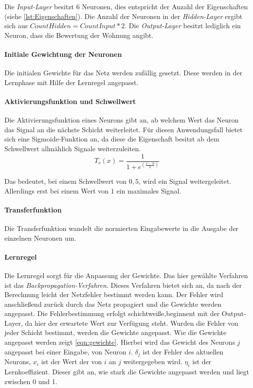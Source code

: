 Die \textit{Input-Layer} besitzt $6$ Neuronen, dies entspricht der
Anzahl der Eigenschaften (siehe \autoref{lst:Eigenschaften}).
Die Anzahl der Neuronen in der \textit{Hidden-Layer} ergibt sich aus
$CountHidden = CountInput * 2$. Die \textit{Output-Layer} besitzt
lediglich ein Neuron, dass die Bewertung der Wohnung angibt.

\paragraph{Initiale Gewichtung der Neuronen}
Die initialen Gewichte für das Netz werden zufällig gesetzt. Diese werden in der Lernphase
mit Hilfe der Lernregel angepasst.

\paragraph{Aktivierungsfunktion und Schwellwert}
Die Aktivierungsfunktion eines Neurons gibt an, ab welchem Wert das Neuron das
Signal an die nächste Schicht weiterleitet.
Für diesen Anwendungsfall bietet sich eine Sigmoide-Funktion an,
da diese die Eigenschaft besitzt ab dem Schwellwert allmählich
Signale weiterzuleiten.\\

\begin{equation}
    T_s(x) = \frac{1}{1+e^(\frac{x-S}{k})}
\end{equation}

Das bedeutet, bei einem Schwellwert von $0,5$, wird ein Signal weitergeleitet.
Allerdings erst bei einem Wert von $1$ ein maximales Signal.


\paragraph{Transferfunktion}
Die Transferfunktion wandelt die normierten Eingabewerte in die Ausgabe der einzelnen Neuronen um.

\paragraph{Lernregel}
Die Lernregel sorgt für die Anpassung der Gewichte. Das hier gewählte
Verfahren ist das \textit{Backpropagation-Verfahren}.
Dieses Verfahren bietet sich an, da nach der Berechnung leicht der Netzfehler bestimmt werden kann.
Der Fehler wird anschließend zurück durch das Netz propagiert und die Gewichte
werden angepasst. Die Fehlerbestimmung erfolgt schichtweiße,beginnent mit der Output-Layer,
da hier der erwartete Wert zur Verfügung steht. Wurden die Fehler von jeder
Schicht bestimmt, werden die Gewichte angepasst.
Wie die Gewichte angepasst werden zeigt \autoref{eqn:gewichte}.
Hierbei wird das Gewicht des Neurons $j$ angepasst bei einer Eingabe,
von Neuron $i$.
$\delta_j$ ist der Fehler des aktuellen Neurons, $x_i$ ist der Wert der von $i$ an $j$ weitergegeben wird.
$\eta_i$ ist der Lernkoeffizient.
Dieser gibt an, wie stark die Gewichte angepasst werden und liegt zwischen 0 und 1.

